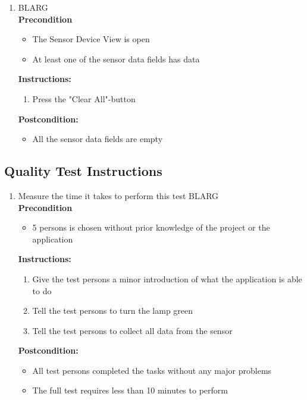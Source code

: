 \documentclass[a4paper]{article}
\newlength{\testlabellength}
\newenvironment{testlist}{\begin{enumerate}[label=\bfseries Instruction \thesubsection.\arabic* , labelindent=0pt, labelwidth=\testlabellength , leftmargin=2cm]}{\end{enumerate}}
\newenvironment{precondition}{
{\color{white}BLARG}\\ 
\textbf{Precondition}
\begin{itemize}[labelindent=0cm, labelwidth=2cm , leftmargin=1cm]
}
{\end{itemize}}
\newenvironment{instruction}{
\textbf{Instructions:}
\begin{enumerate}[label=\bfseries  \arabic*., labelindent=0cm, labelwidth=2cm , leftmargin=1cm]
}
{\end{enumerate}}
\newenvironment{postcondition}{
\textbf{Postcondition:}
\begin{itemize}[labelindent=0cm, labelwidth=2cm , leftmargin=1cm]
}
{\end{itemize}}
\begin{document}
\begin{appendices}
\begin{testlist}
	\item
		\begin{precondition} 
			\item The Sensor Device View is open
			\item At least one of the sensor data fields has data
		\end{precondition}
		\begin{instruction} 
			\item Press the "Clear All"-button
		\end{instruction}
	  	\begin{postcondition}
			\item All the sensor data fields are empty
		\end{postcondition}

\end{testlist}

\subsection{Quality Test Instructions}

\begin{testlist}

	\item Measure the time it takes to perform this test
		\begin{precondition}
			\item 5 persons is chosen without prior knowledge of the project or the application
		\end{precondition}
		\begin{instruction}
			\item Give the test persons a minor introduction of what the application is able to do
            \item Tell the test persons to turn the lamp green
            \item Tell the test persons to collect all data from the sensor
		\end{instruction}
		\begin{postcondition}
			\item All test persons completed the tasks without any major problems
			\item The full test requires less than 10 minutes to perform
		\end{postcondition}


\end{testlist}
\end{appendices}
\end{document}
